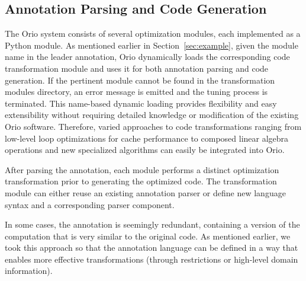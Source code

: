 \subsection{Annotation Parsing and Code Generation}

The Orio system consists of several optimization modules, each implemented as
a Python module. As mentioned earlier in Section~\ref{sec:example}, given the
module name in the leader annotation, Orio dynamically loads the
corresponding code transformation module and uses it for both annotation
parsing and code generation. If the pertinent module cannot be found in the
transformation modules directory, an error message is emitted and the tuning
process is terminated. This name-based dynamic loading provides flexibility
and easy extensibility without requiring detailed knowledge or modification
of the existing Orio software. Therefore, varied approaches to code
transformations ranging from low-level loop optimizations for cache
performance to composed linear algebra operations and new specialized
algorithms can easily be integrated into Orio.

After parsing the annotation, each module performs a distinct optimization
transformation prior to generating the optimized code.  The transformation
module can either reuse an existing annotation parser or define new language
syntax and a corresponding parser component. 

In some cases, the annotation is seemingly redundant, containing a version of
the computation that is very similar to the original code.  As mentioned
earlier, we took this approach so that the annotation language can be defined
in a way that enables more effective transformations (through restrictions or
high-level domain information).

